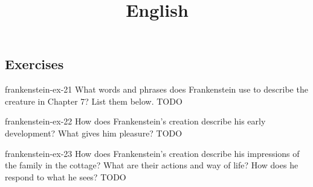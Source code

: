 \documentclass[preview]{standalone}
\begin{document}
\title{English}
\genpage

\subsection{Exercises}

\begin{snippetexercise}{frankenstein-ex-21}
    { What words and phrases does Frankenstein use to describe the creature in Chapter 7? List them
    below.}
    TODO 
\end{snippetexercise}

\begin{snippetexercise}{frankenstein-ex-22}
    {How does Frankenstein's creation describe his early development? What gives him pleasure?}
    TODO 
\end{snippetexercise}

\begin{snippetexercise}{frankenstein-ex-23}
    {How does Frankenstein's creation describe his impressions of the family in the cottage? What are
    their actions and way of life? How does he respond to what he sees?}
    TODO 
\end{snippetexercise}
\end{document}
